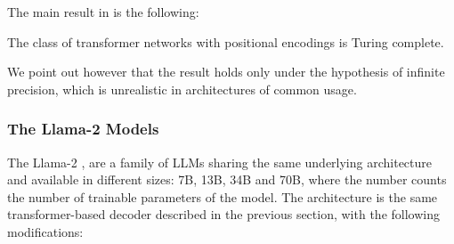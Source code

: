 \documentclass[]{marticle}
\begin{document}
The main result in \cite{transformer-turing} is the following:
\begin{block}[Theorem]
    The class of transformer networks with positional encodings is Turing complete.
\end{block}

We point out however that the result holds only under the hypothesis of infinite precision, which is
unrealistic in architectures of common usage.

\subsubsection{The Llama-2 Models}

The Llama-2 \cite{llama}, \cite{llama-2} are a family of LLMs sharing the same underlying
architecture and available in different sizes: 7B, 13B, 34B and 70B, where the number counts the
number of trainable parameters of the model. The architecture is the same transformer-based decoder
described in the previous section, with the following modifications:
\end{document}
